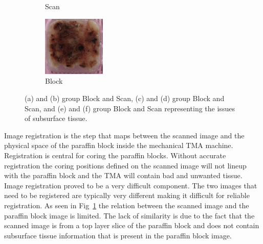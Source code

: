 \documentclass[letterpaper,10pt,oneside]{article}
\begin{document}
\begin{figure}[hbtp]
\begin{subfigure}[b]{.2\textwidth}
    \caption{Scan}
  \end{subfigure}
  \begin{subfigure}[b]{.2\textwidth}
	  \includegraphics[width=3cm]{images/PO14004821_B3.JPG} 
    \caption{Block}
  \end{subfigure}
	\caption{(a) and (b) group Block and Scan, (c) and (d) group Block and Scan, and (e) and (f) group Block and Scan representing the issues of subsurface tissue.}
	\label{fig:subsurface}
\end{figure}
Image registration is the step that maps between the scanned image and the physical space of the paraffin block inside the mechanical TMA machine. Registration is central for coring the paraffin blocks. Without accurate registration the coring positions defined on the scanned image will not lineup with the paraffin block and the TMA will contain bad and unwanted tissue. Image registration proved to be a very difficult component. The two images that need to be registered are typically very different making it difficult for reliable registration. As seen in Fig~\ref{fig:subsurface} the relation between the scanned image and the paraffin block image is limited. The lack of similarity is due to the fact that the scanned image is from a top layer slice of the paraffin block and does not contain subsurface tissue information that is present in the paraffin block image.
\end{document}
